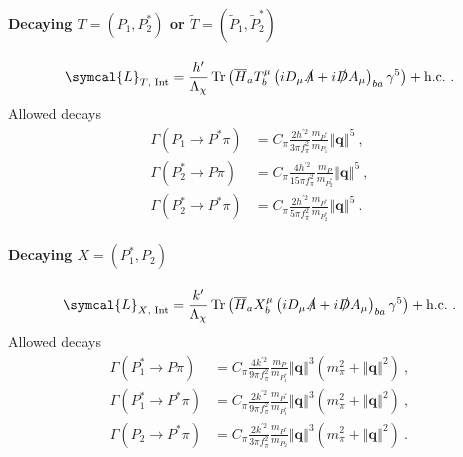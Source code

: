\paragraph{Decaying $T = \left( P_1, P^*_2 \right)$ or $\tilde{T} = \left(\tilde{P}_1, \tilde{P}^*_2 \right)$}
\begin{equation}
  \symcal{L}_{T \text{, Int}} =  \frac{h'}{\Lambda_\chi} \tr{\left(\adj{H}_a T^\mu_b \left( i D_\mu \slashed{A} + i \slashed{D} A_\mu \right)_{ba} \gamma^5 \right)} + \text{h.c.} \ .
\end{equation}
Allowed decays
\begin{subequations}
  \begin{align}
    \Gamma \left( P_1 \to P^* \pi \right) &= C_\pi \frac{2 h^{\prime 2}}{3 \pi f_\pi^2} \frac{m_{P^*}}{ m_{P_1}} \left\Vert \symbf{q} \right\Vert^5 \ , 
    \label{eq:P1toP*pi} \\
    \Gamma \left( P_2^* \to P \pi \right) &= C_\pi \frac{4 h^{\prime 2}}{15 \pi f_\pi^2} \frac{m_P}{m_{P_2^*}} \left\Vert \symbf{q} \right\Vert^5 \ , 
    \label{eq:P2*toPpi} \\
    \Gamma \left( P_2^* \to P^* \pi \right) &= C_\pi \frac{2 h^{\prime 2}}{5 \pi f_\pi^2} \frac{m_{P^*}}{m_{P_2^*}} \left\Vert \symbf{q} \right\Vert^5 \ .
    \label{eq:P2*toP*pi}
  \end{align}
\end{subequations}

\paragraph{Decaying $X = \left( P_1^* , P_2 \right)$}
\begin{equation}
  \symcal{L}_{X \text{, Int}} = \frac{k'}{\Lambda_\chi} \tr{\left( \adj{H}_a X^\mu_b \left( i D_\mu \slashed{A} + i \slashed{D} A_\mu \right)_{ba} \gamma^5 \right)} + \text{h.c.} \ .
\end{equation}
Allowed decays
\begin{subequations}
  \begin{align}
    \Gamma \left( P^*_1 \to P \pi \right) &= C_\pi \frac{4 k^{\prime 2}}{9 \pi f_\pi^2} \frac{m_P}{m_{P^*_1}} \left\Vert \symbf{q} \right\Vert^3 \left( m_\pi^2 + \left\Vert \symbf{q} \right\Vert^2 \right) \ , \\
    \Gamma \left( P^*_1 \to P^* \pi \right) &= C_\pi \frac{2 k^{\prime 2 }}{9 \pi f_\pi^2} \frac{m_{P^*}}{m_{P^*_1}} \left\Vert \symbf{q} \right\Vert^3 \left( m_\pi^2 + \left\Vert \symbf{q} \right\Vert^2 \right) \ , \\
    \Gamma \left( P_2 \to P^* \pi \right) &= C_\pi \frac{2 k^{\prime 2}}{3 \pi f_\pi^2} \frac{m_{P^*}}{m_{P_2}} \left\Vert \symbf{q} \right\Vert^3 \left( m_\pi^2 + \left\Vert \symbf{q} \right\Vert^2 \right) \ . \\
  \end{align}
\end{subequations}

